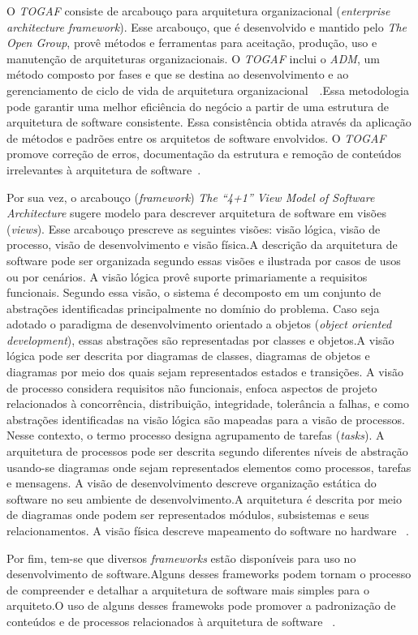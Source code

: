 O \emph{\acrfull{TOGAF}} consiste de arcabouço para arquitetura organizacional (\emph{enterprise architecture framework}). Esse arcabouço, que é desenvolvido e mantido pelo \emph{The Open Group}, provê métodos e ferramentas para aceitação, produção, uso e manutenção de arquiteturas organizacionais. O \emph{\acrfull{TOGAF}} inclui o \emph{\acrfull{ADM}}, um método composto por fases e que se destina ao desenvolvimento e ao gerenciamento de ciclo de vida de arquitetura organizacional~\cite{ISO_42010}~\cite{Togaf}.Essa metodologia  pode garantir uma melhor eficiência do negócio a partir de uma estrutura de arquitetura de software consistente. Essa consistência obtida através da aplicação de métodos e padrões entre os arquitetos de software envolvidos. O \emph{\acrfull{TOGAF}} promove correção de erros, documentação da estrutura e remoção de conteúdos irrelevantes à arquitetura de software~\cite{Togaf}.

Por sua vez, o arcabouço (\emph{framework}) \emph{The “4+1” View Model of Software Architecture} sugere modelo para descrever arquitetura de software em visões (\emph{views}). 
Esse arcabouço prescreve as seguintes visões: visão lógica, visão de processo, visão de desenvolvimento e visão física.A descrição da arquitetura de software pode ser organizada segundo essas visões e ilustrada por casos de usos ou por cenários.
A visão lógica provê suporte primariamente a requisitos funcionais. Segundo essa visão, o sistema é decomposto em um conjunto de abstrações identificadas principalmente no domínio do problema. Caso seja adotado o paradigma de desenvolvimento orientado a objetos (\emph{object oriented development}), essas abstrações são representadas por classes e objetos.A visão lógica pode ser descrita por diagramas de classes, diagramas de objetos e diagramas por meio dos quais sejam representados estados e transições.
A visão de processo considera requisitos não funcionais, enfoca aspectos de projeto relacionados à concorrência, distribuição, integridade, tolerância a falhas, e como abstrações identificadas na visão lógica são mapeadas para a visão de processos. Nesse contexto, o termo processo designa agrupamento de tarefas (\emph{tasks}).
A arquitetura de processos pode ser descrita segundo diferentes níveis de abstração usando-se diagramas onde sejam representados elementos como processos, tarefas e mensagens.
A visão de desenvolvimento descreve organização estática do software no seu ambiente de desenvolvimento.A arquitetura é descrita por meio de diagramas onde podem ser representados módulos, subsistemas e seus relacionamentos.
A visão física descreve mapeamento do software no hardware ~\cite{4plus1}. 

Por fim, tem-se que diversos \emph{frameworks} estão disponíveis para uso no desenvolvimento de software.Alguns desses frameworks  podem tornam o processo de compreender e detalhar a arquitetura de software mais simples para o arquiteto.O uso de alguns desses framewoks pode promover a padronização de conteúdos e de processos relacionados à arquitetura de software ~\cite{ISO_42010}.
